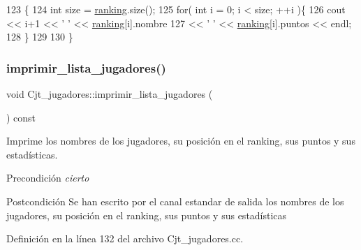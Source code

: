 \begin{DoxyCode}
123 \{
124   \textcolor{keywordtype}{int} size = \hyperlink{class_cjt__jugadores_a2a64dd6a0c9315af038dfdb4c27da059}{ranking}.size();
125   \textcolor{keywordflow}{for}( \textcolor{keywordtype}{int} i = 0; i < size; ++i )\{
126     cout << i+1 << \textcolor{charliteral}{' '} << \hyperlink{class_cjt__jugadores_a2a64dd6a0c9315af038dfdb4c27da059}{ranking}[i].nombre 
127          << \textcolor{charliteral}{' '} << \hyperlink{class_cjt__jugadores_a2a64dd6a0c9315af038dfdb4c27da059}{ranking}[i].puntos << endl;
128   \}
129 
130 \}
\end{DoxyCode}
\mbox{\label{class_cjt__jugadores_aeeb65f2beec6cac01abf0135b37dd104}} 
\subsubsection{\texorpdfstring{imprimir\+\_\+lista\+\_\+jugadores()}{imprimir\_lista\_jugadores()}}
{\footnotesize\ttfamily void Cjt\+\_\+jugadores\+::imprimir\+\_\+lista\+\_\+jugadores (\begin{DoxyParamCaption}{ }\end{DoxyParamCaption}) const}



Imprime los nombres de los jugadores, su posición en el ranking, sus puntos y sus estadísticas. 

\begin{DoxyPrecond}{Precondición}
{\itshape cierto} 
\end{DoxyPrecond}
\begin{DoxyPostcond}{Postcondición}
Se han escrito por el canal estandar de salida los nombres de los jugadores, su posición en el ranking, sus puntos y sus estadísticas 
\end{DoxyPostcond}


Definición en la línea 132 del archivo Cjt\+\_\+jugadores.\+cc.


